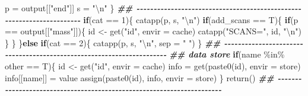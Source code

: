 \documentclass[
]{article}
\newenvironment{Shaded}{\begin{snugshade}}{\end{snugshade}}
\newcommand{\AttributeTok}[1]{\textcolor[rgb]{0.77,0.63,0.00}{#1}}
\newcommand{\ControlFlowTok}[1]{\textcolor[rgb]{0.13,0.29,0.53}{\textbf{#1}}}
\newcommand{\DecValTok}[1]{\textcolor[rgb]{0.00,0.00,0.81}{#1}}
\newcommand{\DocumentationTok}[1]{\textcolor[rgb]{0.56,0.35,0.01}{\textbf{\textit{#1}}}}
\newcommand{\FunctionTok}[1]{\textcolor[rgb]{0.00,0.00,0.00}{#1}}
\newcommand{\NormalTok}[1]{#1}
\newcommand{\OtherTok}[1]{\textcolor[rgb]{0.56,0.35,0.01}{#1}}
\newcommand{\SpecialCharTok}[1]{\textcolor[rgb]{0.00,0.00,0.00}{#1}}
\newcommand{\StringTok}[1]{\textcolor[rgb]{0.31,0.60,0.02}{#1}}
\begin{document}
\begin{Shaded}
\begin{Highlighting}[]
\NormalTok{      p }\OtherTok{=}\NormalTok{ output[[}\StringTok{"end"}\NormalTok{]]}
\NormalTok{      s }\OtherTok{=} \StringTok{"}\SpecialCharTok{\textbackslash{}n}\StringTok{"}
\NormalTok{    \}}
    \DocumentationTok{\#\# {-}{-}{-}{-}{-}{-}{-}{-}{-}{-}{-}{-}{-}{-}{-}{-}{-}{-}{-}{-}{-}{-}{-}{-}{-}{-}{-}{-}{-}{-}{-}{-}{-}{-}{-}{-}{-}{-}{-}{-}{-}{-}{-}{-}{-}{-}{-}{-}{-}{-}{-}{-}{-}{-}{-}{-}{-}{-}{-}{-}{-}{-}{-}{-}{-}{-}{-}{-}{-}{-} }
    \ControlFlowTok{if}\NormalTok{(cat }\SpecialCharTok{==} \DecValTok{1}\NormalTok{)\{}
      \FunctionTok{catapp}\NormalTok{(p, s, }\StringTok{"}\SpecialCharTok{\textbackslash{}n}\StringTok{"}\NormalTok{)}
      \ControlFlowTok{if}\NormalTok{(add\_scans }\SpecialCharTok{==}\NormalTok{ T)\{}
        \ControlFlowTok{if}\NormalTok{(p }\SpecialCharTok{==}\NormalTok{ output[[}\StringTok{"mass"}\NormalTok{]])\{}
\NormalTok{          id }\OtherTok{\textless{}{-}} \FunctionTok{get}\NormalTok{(}\StringTok{"id"}\NormalTok{, }\AttributeTok{envir =}\NormalTok{ cache)}
          \FunctionTok{catapp}\NormalTok{(}\StringTok{"SCANS="}\NormalTok{, id, }\StringTok{"}\SpecialCharTok{\textbackslash{}n}\StringTok{"}\NormalTok{)}
\NormalTok{        \}}
\NormalTok{      \}}
\NormalTok{    \}}\ControlFlowTok{else} \ControlFlowTok{if}\NormalTok{(cat }\SpecialCharTok{==} \DecValTok{2}\NormalTok{)\{}
      \FunctionTok{catapp}\NormalTok{(p, s, }\StringTok{"}\SpecialCharTok{\textbackslash{}n}\StringTok{"}\NormalTok{, }\AttributeTok{sep =} \StringTok{" "}\NormalTok{)}
\NormalTok{    \}}
    \DocumentationTok{\#\# {-}{-}{-}{-}{-}{-}{-}{-}{-}{-}{-}{-}{-}{-}{-}{-}{-}{-}{-}{-}{-}{-}{-}{-}{-}{-}{-}{-}{-}{-}{-}{-}{-}{-}{-}{-}{-}{-}{-}{-}{-}{-}{-}{-}{-}{-}{-}{-}{-}{-}{-}{-}{-}{-}{-}{-}{-}{-}{-}{-}{-}{-}{-}{-}{-}{-}{-}{-}{-}{-} }
    \DocumentationTok{\#\# data store}
    \ControlFlowTok{if}\NormalTok{(name }\SpecialCharTok{\%in\%}\NormalTok{ other }\SpecialCharTok{==}\NormalTok{ T)\{}
\NormalTok{      id }\OtherTok{\textless{}{-}} \FunctionTok{get}\NormalTok{(}\StringTok{"id"}\NormalTok{, }\AttributeTok{envir =}\NormalTok{ cache)}
\NormalTok{      info }\OtherTok{=} \FunctionTok{get}\NormalTok{(}\FunctionTok{paste0}\NormalTok{(id), }\AttributeTok{envir =}\NormalTok{ store)}
\NormalTok{      info[[name]] }\OtherTok{=}\NormalTok{ value}
      \FunctionTok{assign}\NormalTok{(}\FunctionTok{paste0}\NormalTok{(id), info, }\AttributeTok{envir =}\NormalTok{ store)}
\NormalTok{    \}}
    \FunctionTok{return}\NormalTok{()}
    \DocumentationTok{\#\# {-}{-}{-}{-}{-}{-}{-}{-}{-}{-}{-}{-}{-}{-}{-}{-}{-}{-}{-}{-}{-}{-}{-}{-}{-}{-}{-}{-}{-}{-}{-}{-}{-}{-}{-}{-}{-}{-}{-}{-}{-}{-}{-}{-}{-}{-}{-}{-}{-}{-}{-}{-}{-}{-}{-}{-}{-}{-}{-}{-}{-}{-}{-}{-}{-}{-}{-}{-}{-}{-} }

\end{Highlighting}
\end{Shaded}
\end{document}
